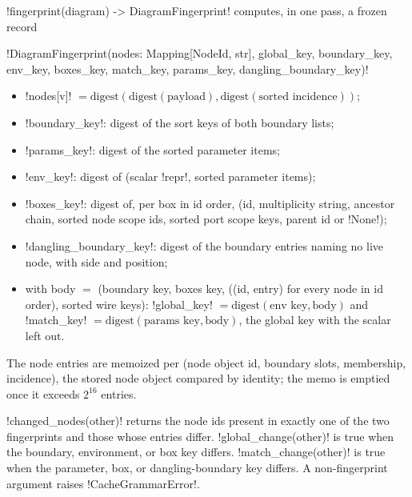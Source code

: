 \begin{definition}[Fingerprint]\label{def:rewriting-fingerprint}
\py!fingerprint(diagram) -> DiagramFingerprint! computes, in one pass, a frozen record
\begin{signature}
\py!DiagramFingerprint(nodes: Mapping[NodeId, str], global_key, boundary_key, env_key, boxes_key, match_key, params_key, dangling_boundary_key)!
\end{signature}
\begin{itemize}
\item \py!nodes[v]! $=\mathrm{digest}(\mathrm{digest}(\text{payload}), \mathrm{digest}(\text{sorted incidence}))$;
\item \py!boundary_key!: digest of the sort keys of both boundary lists;
\item \py!params_key!: digest of the sorted parameter items;
\item \py!env_key!: digest of (scalar \py!repr!, sorted parameter items);
\item \py!boxes_key!: digest of, per box in id order, (id, multiplicity string, ancestor chain,
  sorted node scope ids, sorted port scope keys, parent id or \py!None!);
\item \py!dangling_boundary_key!: digest of the boundary entries naming no live node, with side and
  position;
\item with body $=$ (boundary key, boxes key, ((id, entry) for every node in id order), sorted wire
  keys): \py!global_key! $=\mathrm{digest}(\text{env key}, \text{body})$ and
  \py!match_key! $=\mathrm{digest}(\text{params key}, \text{body})$, the global key with the scalar
  left out.
\end{itemize}
\end{definition}
The node entries are memoized per (node object id, boundary slots, membership, incidence), the
stored node object compared by identity; the memo is emptied once it exceeds $2^{16}$ entries.

\py!changed_nodes(other)! returns the node ids present in exactly one of the two fingerprints and
those whose entries differ. \py!global_change(other)! is true when the boundary, environment, or
box key differs. \py!match_change(other)! is true when the parameter, box, or dangling-boundary key
differs. A non-fingerprint argument raises \py!CacheGrammarError!.


